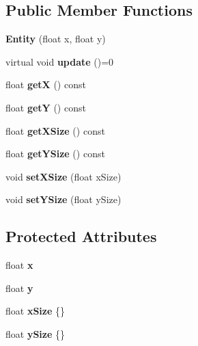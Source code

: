 \subsection*{Public Member Functions}
\begin{DoxyCompactItemize}
\item 
\mbox{\label{classentities_1_1Entity_a3296f5835063af13ba9569156389f0dc}} 
{\bfseries Entity} (float x, float y)
\item 
\mbox{\label{classentities_1_1Entity_a691e01bec14ee30f0dafbc737c91dd65}} 
virtual void {\bfseries update} ()=0
\item 
\mbox{\label{classentities_1_1Entity_a2c862fc18b3bfbdc0be17c1a3aaf481e}} 
float {\bfseries getX} () const
\item 
\mbox{\label{classentities_1_1Entity_aca6bc17b74cb9f128c7d2dcc35289872}} 
float {\bfseries getY} () const
\item 
\mbox{\label{classentities_1_1Entity_a39f898fbcc8567863445b4eb37cd0c8e}} 
float {\bfseries get\+X\+Size} () const
\item 
\mbox{\label{classentities_1_1Entity_ac2d2d809988105028e4780ca9ae7bef0}} 
float {\bfseries get\+Y\+Size} () const
\item 
\mbox{\label{classentities_1_1Entity_aa3a8d8b0fe6c9d24ceefc2ee9b43eeba}} 
void {\bfseries set\+X\+Size} (float x\+Size)
\item 
\mbox{\label{classentities_1_1Entity_a84bfd5b99f29a311ba56d2a169159a58}} 
void {\bfseries set\+Y\+Size} (float y\+Size)
\end{DoxyCompactItemize}
\subsection*{Protected Attributes}
\begin{DoxyCompactItemize}
\item 
\mbox{\label{classentities_1_1Entity_a5f6bfef09f32ec0318c4e9b31f3f5d30}} 
float {\bfseries x}
\item 
\mbox{\label{classentities_1_1Entity_ad86552a73f78657191886938a112650d}} 
float {\bfseries y}
\item 
\mbox{\label{classentities_1_1Entity_a6c6229b1adff361f2417be10f9c40f9e}} 
float {\bfseries x\+Size} \{\}
\item 
\mbox{\label{classentities_1_1Entity_a62e94bd59fe6248b0e1d61e470d7b2b7}} 
float {\bfseries y\+Size} \{\}
\end{DoxyCompactItemize}
